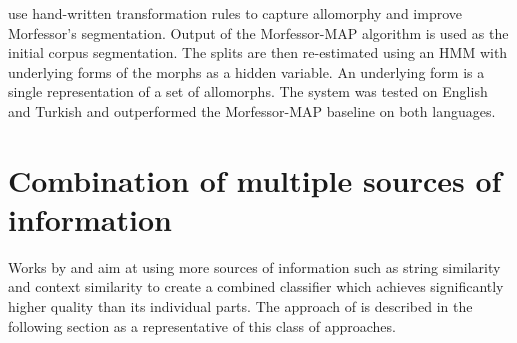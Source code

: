 \cite{tepper10} use hand-written transformation rules to capture allomorphy and improve Morfessor's segmentation. Output of the Morfessor-MAP algorithm is used as the initial corpus segmentation. The splits are then re-estimated using an HMM with underlying forms of the morphs as a hidden variable. An underlying form is a single representation of a set of allomorphs. The system was tested on English and Turkish and outperformed the Morfessor-MAP baseline on both languages.

\section{Combination of multiple sources of information}
Works by \cite{yarowsky00} and \cite{schone01} aim at using more sources of information such as string similarity and context similarity to create a combined classifier which achieves significantly higher quality than its individual parts. The approach of \cite{yarowsky00} is described in the following section as a representative of this class of approaches.

